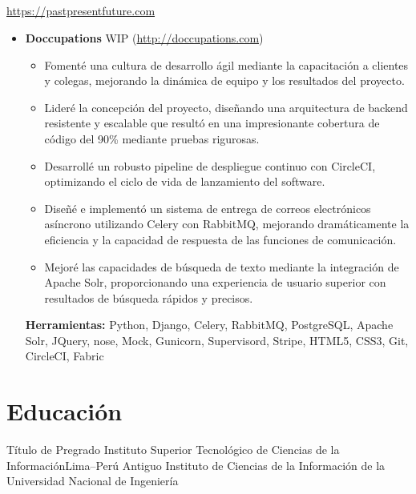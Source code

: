 \documentclass[11pt,a4paper,english]{moderncv}
\begin{document}
\subsection{}

{
    \url{https://pastpresentfuture.com}
\newline{}
\begin{itemize}
    \item \textbf{Doccupations}
        \newline{}
        WIP (\url{http://doccupations.com})
        \begin{itemize}
            \item Fomenté una cultura de desarrollo ágil mediante la capacitación a clientes y colegas, mejorando la dinámica de equipo y los resultados del proyecto.
            \item Lideré la concepción del proyecto, diseñando una arquitectura de backend resistente y escalable que resultó en una impresionante cobertura de código del 90\% mediante pruebas rigurosas.
            \item Desarrollé un robusto pipeline de despliegue continuo con CircleCI, optimizando el ciclo de vida de lanzamiento del software.
            \item Diseñé e implementó un sistema de entrega de correos electrónicos asíncrono utilizando Celery con RabbitMQ, mejorando dramáticamente la eficiencia y la capacidad de respuesta de las funciones de comunicación.
            \item Mejoré las capacidades de búsqueda de texto mediante la integración de Apache Solr, proporcionando una experiencia de usuario superior con resultados de búsqueda rápidos y precisos.
        \end{itemize}
        \textbf{Herramientas:} Python, Django, Celery, RabbitMQ, PostgreSQL, Apache Solr, JQuery, nose, Mock, Gunicorn, Supervisord, Stripe, HTML5, CSS3, Git, CircleCI, Fabric
\end{itemize}
}

\subsection{}

\section{Educación}
    {Título de Pregrado}
    {Instituto Superior Tecnológico de Ciencias de la Información}{Lima--Perú}
    {}{Antiguo Instituto de Ciencias de la Información de la Universidad Nacional de Ingeniería}
\end{document}

